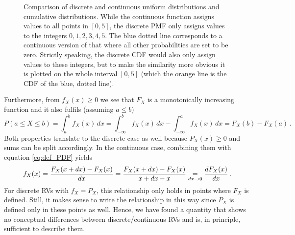 \begin{figure}
\centering

%
\hspace{0.04\textwidth}%
%

\caption{Comparison of discrete and continuous uniform distributions and cumulative distributions. While the continuous function assigns values to all points in $[0, 5]$, the discrete PMF only assigns values to the integers $0, 1, 2, 3, 4, 5$. The blue dotted line corresponds to a continuous version of that where all other probabilities are set to be zero. Strictly speaking, the discrete CDF would also only assign values to these integers, but to make the similarity more obvious it is plotted on the whole interval $[0, 5]$ (which the orange line is the CDF of the blue, dotted line).}
\label{fig:CDF_comparison}
\end{figure}



Furthermore, from $f_X(x) \geq 0$ we see that $F_X$ is a monotonically increasing function and it also fulfils (assuming $a \leq b$)
\begin{equation}
P(a \leq X \leq b) = \int_a^b f_X(x) \, dx = \int_{-\infty}^b f_X(x) \, dx - \int_{-\infty}^a f_X(x) \, dx = F_X(b) - F_X(a) \, .%
\end{equation}
Both properties translate to the discrete case as well because $P_X(x) \geq 0$ and sums can be split accordingly. In the continuous case, combining them with equation \eqref{eq:def_PDF} yields
\begin{equation}
f_X(x) = \frac{F_X(x + dx) - F_X(x)}{dx} = \frac{F_X(x + dx) - F_X(x)}{x + dx - x} \underset{dx \rightarrow 0}{=} \dv{F_X(x)}{x} \, .
\end{equation}
For discrete RVs with $f_X = P_X$, this relationship only holds in points where $F_X$ is defined. Still, it makes sense to write the relationship in this way since $P_X$ is defined only in these points as well. Hence, we have found a quantity that shows no conceptual differences between discrete/continuous RVs and is, in principle, sufficient to describe them.\\


